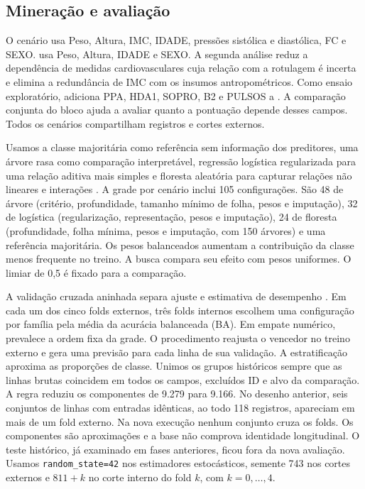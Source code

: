 \subsection{Mineração e avaliação}
O cenário \fisio{} usa Peso, Altura, IMC, IDADE, pressões sistólica e diastólica, FC e SEXO. \strict{} usa Peso, Altura, IDADE e SEXO. A segunda análise reduz a dependência de medidas cardiovasculares cuja relação com a rotulagem é incerta e elimina a redundância de IMC com os insumos antropométricos. Como ensaio exploratório, \clin{} adiciona PPA, HDA1, SOPRO, B2 e PULSOS a \fisio{}. A comparação conjunta do bloco ajuda a avaliar quanto a pontuação depende desses campos. Todos os cenários compartilham registros e cortes externos.

Usamos a classe majoritária como referência sem informação dos preditores, uma árvore rasa como comparação interpretável, regressão logística regularizada para uma relação aditiva mais simples e floresta aleatória para capturar relações não lineares e interações \cite{breiman2001,pedregosa2011}. A grade por cenário inclui 105 configurações. São 48 de árvore (critério, profundidade, tamanho mínimo de folha, pesos e imputação), 32 de logística (regularização, representação, pesos e imputação), 24 de floresta (profundidade, folha mínima, pesos e imputação, com 150 árvores) e uma referência majoritária. Os pesos balanceados aumentam a contribuição da classe menos frequente no treino. A busca compara seu efeito com pesos uniformes. O limiar de 0,5 é fixado para a comparação.

A validação cruzada aninhada separa ajuste e estimativa de desempenho \cite{varma2006}. Em cada um dos cinco folds externos, três folds internos escolhem uma configuração por família pela média da acurácia balanceada (BA). Em empate numérico, prevalece a ordem fixa da grade. O procedimento reajusta o vencedor no treino externo e gera uma previsão para cada linha de sua validação. A estratificação aproxima as proporções de classe. Unimos os grupos históricos sempre que as linhas brutas coincidem em todos os campos, excluídos ID e alvo da comparação. A regra reduziu os componentes de 9.279 para 9.166. No desenho anterior, seis conjuntos de linhas com entradas idênticas, ao todo 118 registros, apareciam em mais de um fold externo. Na nova execução nenhum conjunto cruza os folds. Os componentes são aproximações e a base não comprova identidade longitudinal. O teste histórico, já examinado em fases anteriores, ficou fora da nova avaliação. Usamos \texttt{random\_state=42} nos estimadores estocásticos, semente 743 nos cortes externos e \(811+k\) no corte interno do fold \(k\), com \(k=0,\ldots,4\).

